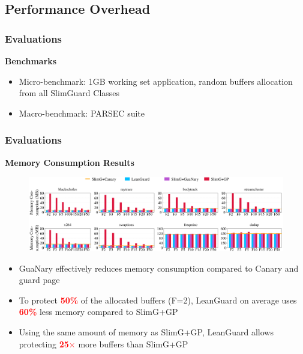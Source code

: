 \documentclass[xcolor=table,bigger,unknownkeysallowed]{beamer}
\newcommand{\myemph}[1]{\textcolor{red}{\bf #1}}
\begin{document}
\subsection{Performance Overhead}
\begin{frame}
	\frametitle{Evaluations} 
	\textbf{Benchmarks}\\
	\vspace*{.5cm}
	\begin{itemize}
		\item Micro-benchmark: 1GB working set application, random buffers allocation from all SlimGuard Classes
		\item Macro-benchmark: PARSEC suite
	\end{itemize}
\end{frame}
\begin{frame}
	\frametitle{Evaluations} 
	\textbf{Memory Consumption Results}\\
	\vspace*{-.1cm}
	\begin{figure}
		\centering
		\includegraphics[width=.8\columnwidth]{fig/memory_conso.png}
	\end{figure}
	\vspace*{-.1cm}
	\begin{itemize}
		\item GuaNary effectively reduces memory consumption compared to Canary and guard page
		\item To protect \myemph{50\%} of the allocated buffers (F=2), LeanGuard on average uses \myemph{60\%} less memory compared to SlimG+GP
		\item Using the same amount of memory as SlimG+GP, LeanGuard allows protecting \myemph{25$\times$} more buffers than SlimG+GP
	\end{itemize}	
\end{frame}
\end{document}
